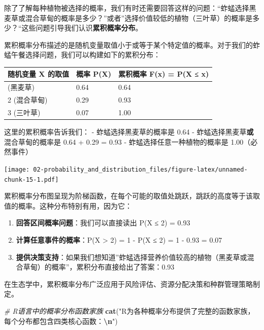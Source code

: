 \documentclass[
  twoside]{book}
\newenvironment{Shaded}{\begin{snugshade}}{\end{snugshade}}
\newcommand{\CommentTok}[1]{\textcolor[rgb]{0.56,0.35,0.01}{\textit{#1}}}
\newcommand{\FunctionTok}[1]{\textcolor[rgb]{0.13,0.29,0.53}{\textbf{#1}}}
\newcommand{\NormalTok}[1]{#1}
\newcommand{\SpecialCharTok}[1]{\textcolor[rgb]{0.81,0.36,0.00}{\textbf{#1}}}
\newcommand{\StringTok}[1]{\textcolor[rgb]{0.31,0.60,0.02}{#1}}
\providecommand{\tightlist}{%
  \setlength{\itemsep}{0pt}\setlength{\parskip}{0pt}}
\begin{document}
除了了解每种植物被选择的概率，我们有时还需要回答这样的问题：``蚱蜢选择黑麦草或混合草甸的概率是多少？''或者''选择价值较低的植物（三叶草）的概率是多少？``这些问题引导我们认识\textbf{累积概率分布}。

累积概率分布描述的是随机变量取值小于或等于某个特定值的概率。对于我们的蚱蜢午餐选择问题，我们可以构建如下的累积分布：

\begin{longtable}[]{@{}lll@{}}
\toprule\noalign{}
随机变量 X 的取值 & 概率 P(X) & 累积概率 F(x) = P(X ≤ x) \\
\midrule\noalign{}
\endhead
\bottomrule\noalign{}
\endlastfoot
1 (黑麦草) & 0.64 & 0.64 \\
2 (混合草甸) & 0.29 & 0.93 \\
3 (三叶草) & 0.07 & 1.00 \\
\end{longtable}

这里的累积概率告诉我们：
- 蚱蜢选择黑麦草的概率是 0.64
- 蚱蜢选择黑麦草\textbf{或}混合草甸的概率是 0.64 + 0.29 = 0.93
- 蚱蜢选择任意一种植物的概率是 1.00（必然事件）

\texttt{[image: 02-probability\_and\_distribution\_files/figure-latex/unnamed-chunk-15-1.pdf]}

累积概率分布图呈现为阶梯函数，在每个可能的取值处跳跃，跳跃的高度等于该取值的概率。这种分布特别有用，因为它：

\begin{enumerate}
\def\labelenumi{\arabic{enumi}.}
\tightlist
\item
  \textbf{回答区间概率问题}：我们可以直接读出 P(X ≤ 2) = 0.93\\
\item
  \textbf{计算任意事件的概率}：P(X \textgreater{} 2) = 1 - P(X ≤ 2) = 1 - 0.93 = 0.07\\
\item
  \textbf{提供决策支持}：如果我们想知道''蚱蜢选择营养价值较高的植物（黑麦草或混合草甸）的概率''，累积分布直接给出了答案：0.93
\end{enumerate}

在生态学中，累积概率分布广泛应用于风险评估、资源分配决策和种群管理策略制定。

\begin{Shaded}
\begin{Highlighting}[]
\CommentTok{\# R语言中的概率分布函数家族}
\FunctionTok{cat}\NormalTok{(}\StringTok{"R为各种概率分布提供了完整的函数家族，每个分布都包含四类核心函数：}\SpecialCharTok{\textbackslash{}n}\StringTok{"}\NormalTok{)}
\end{Highlighting}
\end{Shaded}
\end{document}
